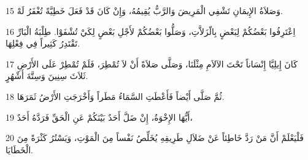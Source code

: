 \par 15 وَصَلاَةُ الإِيمَانِ تَشْفِي الْمَرِيضَ وَالرَّبُّ يُقِيمُهُ، وَإِنْ كَانَ قَدْ فَعَلَ خَطِيَّةً تُغْفَرُ لَهْ.
\par 16 اِعْتَرِفُوا بَعْضُكُمْ لِبَعْضٍ بِالّزَلاَّتِ، وَصَلُّوا بَعْضُكُمْ لأَجْلِ بَعْضٍ لِكَيْ تُشْفَوْا. طِلْبَةُ الْبَارِّ تَقْتَدِرُ كَثِيراً فِي فِعْلِهَا.
\par 17 كَانَ إِيلِيَّا إِنْسَاناً تَحْتَ الآلاَمِ مِثْلَنَا، وَصَلَّى صَلاَةً أَنْ لاَ تُمْطِرَ، فَلَمْ تُمْطِرْ عَلَى الأَرْضِ ثَلاَثَ سِنِينَ وَسِتَّةَ أَشْهُرٍ.
\par 18 ثُمَّ صَلَّى أَيْضاً فَأَعْطَتِ السَّمَاءُ مَطَراً وَأَخْرَجَتِ الأَرْضُ ثَمَرَهَا.
\par 19 أَيُّهَا الإِخْوَةُ، إِنْ ضَلَّ أَحَدٌ بَيْنَكُمْ عَنِ الْحَقِّ فَرَدَّهُ أَحَدٌ،
\par 20 فَلْيَعْلَمْ أَنَّ مَنْ رَدَّ خَاطِئاً عَنْ ضَلاَلِ طَرِيقِهِ يُخَلِّصُ نَفْساً مِنَ الْمَوْتِ، وَيَسْتُرُ كَثْرَةً مِنَ الْخَطَايَا.


